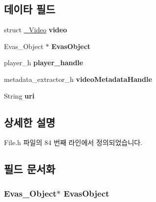 \subsection*{데이타 필드}
\begin{DoxyCompactItemize}
\item 
\hypertarget{struct___video_extends_aa5784e2c1293cd9248e7bd28183fc1f8}{struct \hyperlink{struct___video}{\-\_\-\-Video} {\bfseries video}}\label{struct___video_extends_aa5784e2c1293cd9248e7bd28183fc1f8}

\item 
\hypertarget{struct___video_extends_ae90b76aa97f5689ba22a80cbf6f95a84}{Evas\-\_\-\-Object $\ast$ {\bfseries Evas\-Object}}\label{struct___video_extends_ae90b76aa97f5689ba22a80cbf6f95a84}

\item 
\hypertarget{struct___video_extends_acdbf0738be9fa70a60412d48cad881ee}{player\-\_\-h {\bfseries player\-\_\-handle}}\label{struct___video_extends_acdbf0738be9fa70a60412d48cad881ee}

\item 
\hypertarget{struct___video_extends_a0c761970ca029f0974eadbb58090641c}{metadata\-\_\-extractor\-\_\-h {\bfseries video\-Metadata\-Handle}}\label{struct___video_extends_a0c761970ca029f0974eadbb58090641c}

\item 
\hypertarget{struct___video_extends_ac0b02717b928a36338653c49b0821365}{String {\bfseries uri}}\label{struct___video_extends_ac0b02717b928a36338653c49b0821365}

\end{DoxyCompactItemize}


\subsection{상세한 설명}


File.\-h 파일의 84 번째 라인에서 정의되었습니다.



\subsection{필드 문서화}
\hypertarget{struct___video_extends_ae90b76aa97f5689ba22a80cbf6f95a84}{
\subsubsection[{Evas\-Object}]{\setlength{\rightskip}{0pt plus 5cm}Evas\-\_\-\-Object$\ast$ Evas\-Object}}\label{struct___video_extends_ae90b76aa97f5689ba22a80cbf6f95a84}


